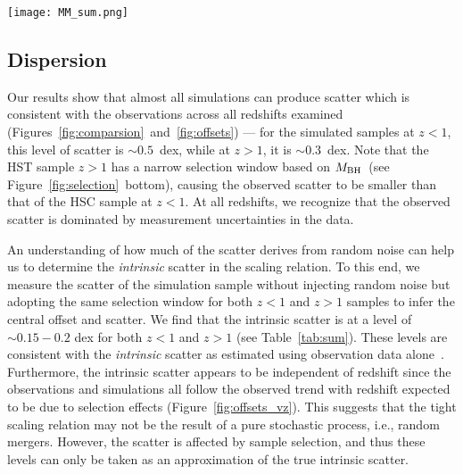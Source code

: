 \documentclass[twocolumn]{aastex631}
\newcommand{\red}[1]{\textcolor{purple}{#1}}
\def\mbh{$M_{\rm BH}$}
\begin{document}
\begin{figure*}
\centering
\texttt{[image: MM\_sum.png]}
\caption{\label{fig:comparsion} 
Black hole mass versus stellar mass for both the observational (small orange circles) and simulated (small colored circles) samples. Each row pertains to a particular simulation as labelled. The panels, from left to right, show different redshift bins. The black line in each panel indicates the local relation adopted by~\citet{Ding2020}. The background cloud (in green and yellow \red{with contours}) shows the intrinsic simulation number density before injecting random noise and applying selection effects. \red{The TNG100 and TNG300 appear to present similar results (see discussion section)}.
}
\end{figure*} 

\subsection{Dispersion}

Our results show that almost all simulations can produce scatter which is consistent with the observations across all redshifts examined (Figures~\ref{fig:comparsion}~and~\ref{fig:offsets}) --- for the simulated samples at $z<1$, this level of scatter is $\sim0.5$~dex, while at $z>1$, it is $\sim0.3$~dex. Note that the HST sample $z>1$ has a narrow selection window based on \mbh\ (see Figure~\ref{fig:selection}~bottom), causing the observed scatter to be smaller than that of the HSC sample at $z<1$. At all redshifts, we recognize that the observed scatter is dominated by measurement uncertainties in the data. 

An understanding of how much of the scatter derives from random noise can help us to determine the {\it intrinsic} scatter in the scaling relation. To this end, we measure the scatter of the simulation sample without injecting random noise but adopting the same selection window for both $z<1$ and $z>1$ samples to infer the central offset and scatter. We find that the intrinsic scatter is at a level of $\sim0.15-0.2$ dex for both $z<1$ and $z>1$ (see Table~\ref{tab:sum}). These levels are consistent with the {\it intrinsic} scatter as estimated using observation data alone~\citep{Ding2020, Li2021b}. Furthermore, the intrinsic scatter appears to be independent of redshift since the observations and simulations all follow the observed trend with redshift expected to be due to selection effects (Figure~\ref{fig:offsets_vz}). This suggests that the tight scaling relation may not be the result of a pure stochastic process, i.e., random mergers. However, the scatter is affected by sample selection, and thus these levels can only be taken as an approximation of the true intrinsic scatter.
\end{document}
